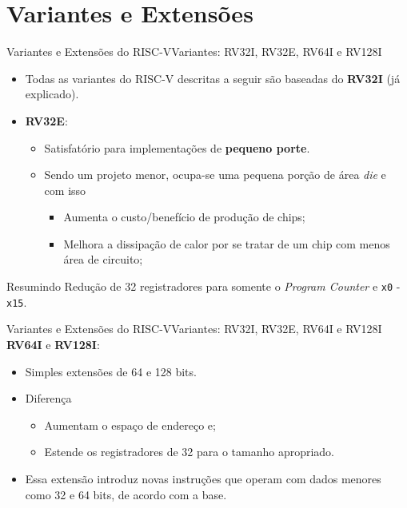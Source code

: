 \documentclass[red, aspectratio=169, xcolor=dvipsnames]{beamer}
\let\olditem=\item%
\renewcommand{\item}{\olditem \justifying}
\begin{document}
\section{Variantes e Extensões}
\begin{frame}{Variantes e Extensões do RISC-V}{Variantes: RV32I, RV32E, RV64I e RV128I}
	\begin{itemize}
		\setlength{\itemsep}{0.5em}
		\item Todas as variantes do RISC-V descritas a seguir são baseadas do \textbf{RV32I} (já explicado).

		\bigskip

		\item \textbf{RV32E}:
		\begin{itemize}
			\item Satisfatório para implementações de \textbf{pequeno porte}. 
			
			\item Sendo um projeto menor, ocupa-se uma pequena porção de área \textit{die} e com isso
			\begin{itemize}
				\item Aumenta o custo/benefício de produção de chips;
				\item Melhora a dissipação de calor por se tratar de um chip com menos área de circuito;
			\end{itemize}
		\end{itemize}
	\end{itemize}
	\begin{block}{Resumindo}
		Redução de 32 registradores para somente o \textit{Program Counter} e \texttt{x0} - \texttt{x15}.
	\end{block}
\end{frame}

\begin{frame}{Variantes e Extensões do RISC-V}{Variantes: RV32I, RV32E, RV64I e RV128I}
	\textbf{RV64I} e \textbf{RV128I}:
	\begin{itemize}
		\setlength{\itemsep}{0.5em}
		
	
		\item Simples extensões de 64 e 128 bits.
		\item Diferença
		\begin{itemize}
			\item Aumentam o espaço de endereço e;
			\item Estende os registradores de 32 para o tamanho apropriado.
		\end{itemize}
	
		\item Essa extensão introduz novas instruções que operam com dados menores como 32 e 64 bits, de acordo com a base.
	\end{itemize}
\end{frame}
\end{document}

